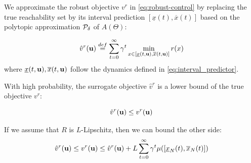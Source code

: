 \documentclass{article}
\begin{document}
\begin{definition}
We approximate the robust objective $v^r$ in \eqref{eq:robust-control} by replacing the true reachability set by its interval prediction $[\underline{x}(t), \overline{x}(t)]$ based on the polytopic approximation $\mathcal{P}_\delta$ of $A(\Theta)$: 

\begin{equation}
\hat{v}^r(\mathbf{u}) \stackrel{def}{=} \sum_{t=0}^\infty \gamma^t \min_{x\in[\underline{x}(t, \mathbf{u}), \overline{x}(t, \mathbf{u})]}  r(x)
\end{equation}
where $\underline{x}(t, \mathbf{u}), \overline{x}(t, \mathbf{u})$ follow the dynamics defined in \eqref{eq:interval_predictor}.
\end{definition}

%

\begin{proposition}
\label{prop:lower-bound}
With high probability, the surrogate objective $\hat{v}^r$ is a lower bound of the true objective $v^r$:

\begin{equation}
\hat{v}^r(\mathbf{u}) \leq v^r(\mathbf{u})
\end{equation}

If we assume that $R$ is $L$-Lipschitz, then we can bound the other side:
\begin{equation*}
     \hat{v}^r(\mathbf{u}) \leq v^r(\mathbf{u}) \leq \hat{v}^r(\mathbf{u}) + L\sum_{t=0}^\infty \gamma^t \mu([\underline{x}_N(t),\overline{x}_N(t)])
\end{equation*}
\end{proposition}
\end{document}
